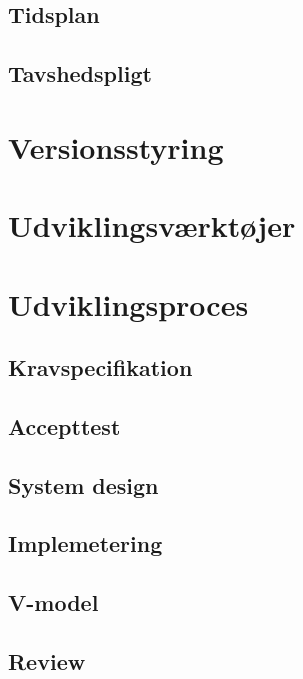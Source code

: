\subsection{Tidsplan}
\subsection{Tavshedspligt}

\section{Versionsstyring}

\section{Udviklingsværktøjer}

\section{Udviklingsproces}
	\subsection{Kravspecifikation} \label{title:kravspecifikation}
	
	\subsection{Accepttest} \label{title:accepttest}
	
	\subsection{System design} \label{title:systemdesign}
	
	\subsection{Implemetering} \label{title:implementering}

\subsection{V-model}



\subsection{Review}
